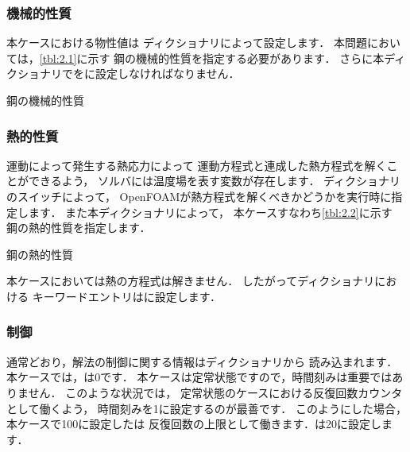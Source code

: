 \subsubsection{機械的性質}
\label{sssec:2.2.1.2}
本ケースにおける物性値は
%
%
ディクショナリによって設定します．
本問題においては，\autoref{tbl:2.1}に示す
鋼の機械的性質を指定する必要があります．
さらに本ディクショナリでをに設定しなければなりません．


\begin{table}[ht]
 
 \caption{鋼の機械的性質}
 \label{tbl:2.1}
\end{table}


\subsubsection{熱的性質}
\label{sssec:2.2.1.3}
運動によって発生する熱応力によって
運動方程式と連成した熱方程式を解くことができるよう，
%
%
ソルバには温度場を表す変数が存在します．
%
%
ディクショナリのスイッチによって，
OpenFOAMが熱方程式を解くべきかどうかを実行時に指定します．
また本ディクショナリによって，
本ケースすなわち\autoref{tbl:2.2}に示す
鋼の熱的性質を指定します．


\begin{table}[ht]
 
 \caption{鋼の熱的性質}
 \label{tbl:2.2}
\end{table}


本ケースにおいては熱の方程式は解きません．
したがってディクショナリにおける
キーワードエントリはに設定します．

\subsubsection{制御}
\label{sssec:2.2.1.4}
通常どおり，解法の制御に関する情報はディクショナリから
読み込まれます．本ケースでは，は0です．
本ケースは定常状態ですので，時間刻みは重要ではありません．
このような状況では，
定常状態のケースにおける反復回数カウンタとして働くよう，
時間刻みを1に設定するのが最善です．
このようにした場合，本ケースで100に設定したは
反復回数の上限として働きます．は20に設定します．

